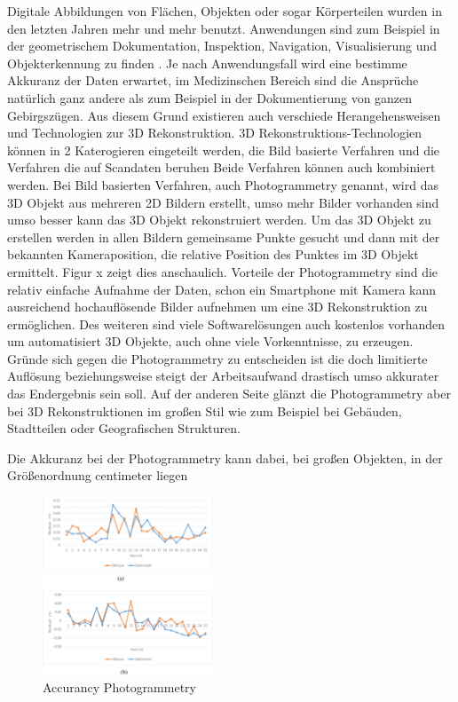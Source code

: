 \documentclass[../main.tex]{subfiles}
\begin{document}
Digitale Abbildungen von Flächen, Objekten oder sogar Körperteilen wurden in den
letzten Jahren mehr und mehr benutzt. Anwendungen sind zum Beispiel in der
geometrischem Dokumentation, Inspektion, Navigation, Visualisierung und 
Objekterkennung zu finden \cite{Verykokou.2023}. Je nach Anwendungsfall wird eine bestimme Akkuranz
der Daten erwartet, im Medizinschen Bereich sind die Ansprüche natürlich ganz 
andere als zum Beispiel in der Dokumentierung von ganzen Gebirgszügen.
Aus diesem Grund existieren auch verschiede Herangehensweisen und Technologien  
zur 3D Rekonstruktion.
3D Rekonstruktions-Technologien können in 2 Katerogieren eingeteilt werden,
die Bild basierte Verfahren und die Verfahren die auf Scandaten beruhen \cite{Verykokou.2023}
Beide Verfahren können auch kombiniert werden. 
Bei Bild basierten Verfahren, auch Photogrammetry genannt, wird das 3D Objekt aus
mehreren 2D Bildern erstellt, umso mehr Bilder vorhanden sind umso besser kann das
3D Objekt rekonstruiert werden. Um das 3D Objekt zu erstellen werden in 
allen Bildern gemeinsame Punkte gesucht und dann mit der bekannten Kameraposition, 
die relative Position des Punktes im 3D Objekt ermittelt. Figur x zeigt dies 
anschaulich.
Vorteile der Photogrammetry sind die relativ einfache Aufnahme der Daten, schon
ein Smartphone mit Kamera kann ausreichend hochauflösende Bilder aufnehmen um 
eine 3D Rekonstruktion zu ermöglichen. Des weiteren sind viele Softwarelösungen
auch kostenlos vorhanden um automatisiert 3D Objekte, auch ohne viele 
Vorkenntnisse, zu erzeugen.
Gründe sich gegen die Photogrammetry zu entscheiden ist die doch limitierte 
Auflösung beziehungsweise steigt der Arbeitsaufwand drastisch umso akkurater
das Endergebnis sein soll. Auf der anderen Seite glänzt die Photogrammetry aber 
bei 3D Rekonstruktionen im großen Stil wie zum Beispiel bei Gebäuden, Stadtteilen
oder Geografischen Strukturen.

Die Akkuranz bei der Photogrammetry kann dabei, bei großen Objekten, in der 
Größenordnung centimeter liegen \cite{10004712}

\begin{figure}[h]
    \centering
    \includegraphics[height=150pt]{images/photogammatry_accurancy.PNG}
    \caption{Accurancy Photogrammetry}
    \label{fig:photogammatryAccuracy}
\end{figure}
\end{document}
